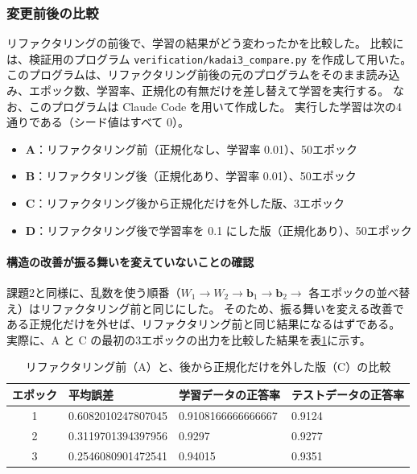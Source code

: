 \documentclass[a4paper,11pt]{ltjsarticle}
\begin{document}
\subsubsection{変更前後の比較}
\label{sec:k3cmp}
リファクタリングの前後で、学習の結果がどう変わったかを比較した。
比較には、検証用のプログラム \texttt{verification/kadai3\_compare.py} を作成して用いた。
このプログラムは、リファクタリング前後の元のプログラムをそのまま読み込み、エポック数、学習率、正規化の有無だけを差し替えて学習を実行する。
なお、このプログラムは Claude Code を用いて作成した。
実行した学習は次の4通りである（シード値はすべて 0）。
\begin{itemize}
  \item \textbf{A}：リファクタリング前（正規化なし、学習率 0.01）、50エポック
  \item \textbf{B}：リファクタリング後（正規化あり、学習率 0.01）、50エポック
  \item \textbf{C}：リファクタリング後から正規化だけを外した版、3エポック
  \item \textbf{D}：リファクタリング後で学習率を 0.1 にした版（正規化あり）、50エポック
\end{itemize}

\paragraph{構造の改善が振る舞いを変えていないことの確認}
課題2と同様に、乱数を使う順番（$W_1 \to W_2 \to \bm{b}_1 \to \bm{b}_2 \to$ 各エポックの並べ替え）はリファクタリング前と同じにした。
そのため、振る舞いを変える改善である正規化だけを外せば、リファクタリング前と同じ結果になるはずである。
実際に、A と C の最初の3エポックの出力を比較した結果を表\ref{tab:k3same}に示す。

\begin{table}[H]
  \centering
  \caption{リファクタリング前（A）と、後から正規化だけを外した版（C）の比較}
  \label{tab:k3same}
  \small
  \begin{tabular}{clll}
    \toprule
    エポック & 平均誤差 & 学習データの正答率 & テストデータの正答率 \\
    \midrule
    1 & 0.6082010247807045 & 0.9108166666666667 & 0.9124 \\
    2 & 0.3119701394397956 & 0.9297             & 0.9277 \\
    3 & 0.2546080901472541 & 0.94015            & 0.9351 \\
    \bottomrule
  \end{tabular}
\end{table}
\end{document}
